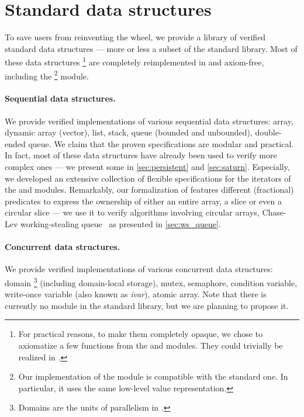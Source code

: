 \section{Standard data structures}
\label{sec:std}

To save users from reinventing the wheel, we provide a library of verified standard data structures --- more or less a subset of the \OCaml standard library.
Most of these data structures%
\footnote{
For practical reasons, to make them completely opaque, we chose to axiomatize a few functions from the  and  modules.
They could trivially be realized in \Zoo.
}
are completely reimplemented in \Zoo and axiom-free, including the %
\footnote{
Our implementation of the  module is compatible with the standard one.
In particular, it uses the same low-level value representation.
}
module.

\paragraph{Sequential data structures.}

We provide verified implementations of various sequential data structures: array, dynamic array (vector), list, stack, queue (bounded and unbounded), double-ended queue.
We claim that the proven specifications are modular and practical.
In fact, most of these data structures have already been used to verify more complex ones --- we present some in \cref{sec:persistent} and \cref{sec:saturn}.
Especially, we developed an extensive collection of flexible specifications for the iterators of the  and  modules.
Remarkably, our formalization of  features different (fractional) predicates to express the ownership of either an entire array, a slice or even a circular slice --- we use it to verify algorithms involving circular arrays, \eg Chase-Lev working-stealing queue~\citep*{DBLP:conf/spaa/ChaseL05} as presented in \cref{sec:ws_queue}.

\paragraph{Concurrent data structures.}

We provide verified implementations of various concurrent data structures: domain%
\footnote{
Domains are the units of parallelism in \OCamlFive.
}
(including domain-local storage), mutex, semaphore, condition variable, write-once variable (also known as \emph{ivar}), atomic array.
Note that there is currently no  module in the \OCaml standard library, but we are planning to propose it.
